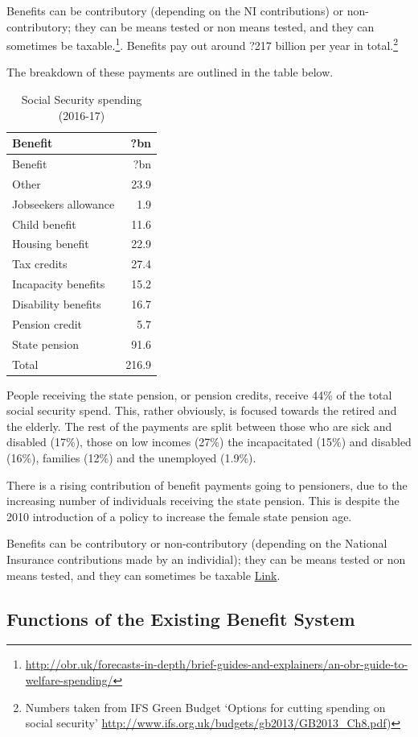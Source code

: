 \documentclass[]{tufte-handout}
\begin{document}
Benefits can be contributory (depending on the NI contributions) or
non-contributory; they can be means tested or non means tested, and they
can sometimes be taxable.\footnote{\url{http://obr.uk/forecasts-in-depth/brief-guides-and-explainers/an-obr-guide-to-welfare-spending/}}.
Benefits pay out around ?217 billion per year in total.\footnote{Numbers
  taken from IFS Green Budget `Options for cutting spending on social
  security' \url{http://www.ifs.org.uk/budgets/gb2013/GB2013_Ch8.pdf})}

\newpage

The breakdown of these payments are outlined in the table below.

\begin{longtable}[]{@{}lr@{}}
\caption{Social Security spending (2016-17)}\tabularnewline
\toprule
Benefit & ?bn\tabularnewline
\midrule
\endfirsthead
\toprule
Benefit & ?bn\tabularnewline
\midrule
\endhead
Other & 23.9\tabularnewline
Jobseekers allowance & 1.9\tabularnewline
Child benefit & 11.6\tabularnewline
Housing benefit & 22.9\tabularnewline
Tax credits & 27.4\tabularnewline
Incapacity benefits & 15.2\tabularnewline
Disability benefits & 16.7\tabularnewline
Pension credit & 5.7\tabularnewline
State pension & 91.6\tabularnewline
Total & 216.9\tabularnewline
\bottomrule
\end{longtable}

People receiving the state pension, or pension credits, receive 44\% of
the total social security spend. This, rather obviously, is focused
towards the retired and the elderly. The rest of the payments are split
between those who are sick and disabled (17\%), those on low incomes
(27\%) the incapacitated (15\%) and disabled (16\%), families (12\%) and
the unemployed (1.9\%).

There is a rising contribution of benefit payments going to pensioners,
due to the increasing number of individuals receiving the state pension.
This is despite the 2010 introduction of a policy to increase the female
state pension age.

Benefits can be contributory or non-contributory (depending on the
National Insurance contributions made by an individial); they can be
means tested or non means tested, and they can sometimes be taxable
\href{http://obr.uk/forecasts-in-depth/brief-guides-and-explainers/an-obr-guide-to-welfare-spending/}{Link}.

\newpage

\hypertarget{functions-of-the-existing-benefit-system}{%
\subsection{Functions of the Existing Benefit
System}\label{functions-of-the-existing-benefit-system}}
\end{document}
